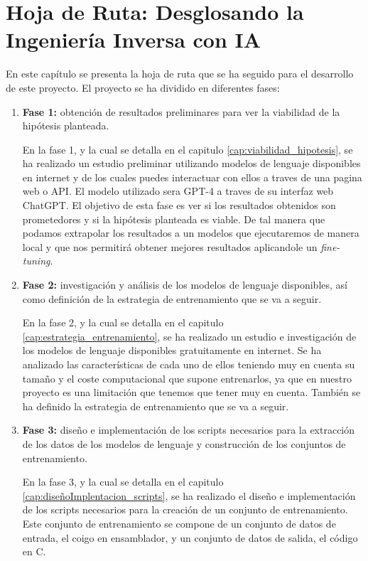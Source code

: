 \chapter{Hoja de Ruta: Desglosando la Ingeniería Inversa con IA}
\label{cap:hoja_de_ruta}

En este capítulo se presenta la hoja de ruta que se ha seguido para el desarrollo de
este proyecto. El proyecto se ha dividido en diferentes fases:

\begin{enumerate}
    \item \textbf{Fase 1:} obtención de resultados preliminares para ver la viabilidad 
        de la hipótesis planteada.

        En la fase 1, y la cual se detalla en el capitulo \ref{cap:viabilidad_hipotesis},
        se ha realizado un estudio preliminar utilizando modelos de lenguaje
        disponibles en internet y de los cuales puedes interactuar con ellos a traves de
        una pagina web o API. El modelo utilizado sera GPT-4 a traves de su interfaz web
        ChatGPT. El objetivo de esta fase es ver si los resultados obtenidos son prometedores
        y si la hipótesis planteada es viable. De tal manera que podamos extrapolar los resultados 
        a un modelos que ejecutaremos de manera local y que nos permitirá obtener mejores resultados
        aplicandole un \textit{fine-tuning}.

    \item \textbf{Fase 2:} investigación y análisis de los modelos de lenguaje disponibles,
        así como definición de la estrategia de entrenamiento que se va a seguir.

        En la fase 2, y la cual se detalla en el capitulo \ref{cap:estrategia_entrenamiento},
        se ha realizado un estudio e investigación de los modelos de lenguaje disponibles
        gratuitamente en internet. Se ha analizado las características de cada uno de ellos
        teniendo muy en cuenta su tamaño y el coste computacional que supone entrenarlos, ya que
        en nuestro proyecto es una limitación que tenemos que tener muy en cuenta. También se ha
        definido la estrategia de entrenamiento que se va a seguir.

    \item \textbf{Fase 3:} diseño e implementación de los scripts necesarios para la
        extracción de los datos de los modelos de lenguaje y construcción de los 
        conjuntos de entrenamiento.

        En la fase 3, y la cual se detalla en el capitulo \ref{cap:diseñoImplentacion_scripts},
        se ha realizado el diseño e implementación de los scripts necesarios para la
        creación de un conjunto de entrenamiento. Este conjunto de entrenamiento se
        compone de un conjunto de datos de entrada, el coigo en ensamblador, y un conjunto
        de datos de salida, el código en C.


\end{enumerate}
